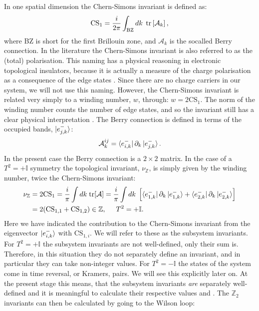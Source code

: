 In one spatial dimension the Chern-Simons invariant is defined as:
\begin{equation}
\text{CS}_1 = \frac{i}{2\pi}\int_{\text{BZ}}dk \; \operatorname{tr}\left[\mathcal{A}_k\right],
\label{eq.definition.CS1}
\end{equation}
where BZ is short for the first Brillouin zone, and $\mathcal{A}_k$ is the socalled Berry connection. In the literature the Chern-Simons invariant is also referred to as the (total) polarisation. This naming has a physical reasoning in electronic topological insulators, because it is actually a measure of the charge polarisation as a consequence of the edge states \cite{FuKane2006}. Since there are no charge carriers in our system, we will not use this naming. However, the Chern-Simons invariant is related very simply to a winding number, $w$, through: $w = 2\text{CS}_1$. The norm of the winding number counts the number of edge states, and so the invariant still has a clear physical interpretation \cite{Chiu.Topology}. The Berry connection is defined in terms of the occupied bands, $\ket{e^{-}_{j,k}}$:
\begin{equation}
\mathcal{A}^{ij}_k = \bra{e^{-}_{i,k}}\partial_k\ket{e^{-}_{j,k}}.
\end{equation}
In the present case the Berry connection is a $2\times 2$ matrix. In the case of a $T^2 = + \mathbb{I}$ symmetry the topological invariant, $\nu_{\mathbb{Z}}$, is simply given by the winding number, twice the Chern-Simons invariant:
\begin{align}
\nu_{\mathbb{Z}} &= 2\text{CS}_1 = \frac{i}{\pi} \int dk\; \text{tr}[\mathcal{A}] = \frac{i}{\pi} \int dk\; \left[\bra{e^{-}_{1,k}}\partial_k\ket{e^{-}_{1,k}} + \bra{e^{-}_{2,k}}\partial_k\ket{e^{-}_{2,k}}  \right] \nonumber \\
 &= 2(\text{CS}_{1,1} + \text{CS}_{1,2})\in \mathbb{Z}, \hspace{0.5cm} T^2 = +\mathbb{I}.
\label{eq.2wires.topinv.T2eqplus1}
\end{align}
Here we have indicated the contribution to the Chern-Simons invariant from the eigenvector $\ket{e^{-}_{i,k}}$ with $\text{CS}_{1,i}$. We will refer to these as the subsystem invariants. For $T^2 = +\mathbb{I}$ the subsystem invariants are not well-defined, only their sum is. Therefore, in this situation they do not separately define an invariant, and in particular they can take non-integer values. For $T^2 = -\mathbb{I}$ the states of the system come in time reversal, or Kramers, pairs. We will see this explicitly later on. At the present stage this means, that the subsystem invariants \textit{are} separately well-defined and it is meaningful to calculate their respective values \cite{FuKane2006, LiYangChen} and \cite[pp. 130-135]{BernevigTITSC}. The $\mathbb{Z}_2$ invariants can then be calculated by going to the Wilson loop:
